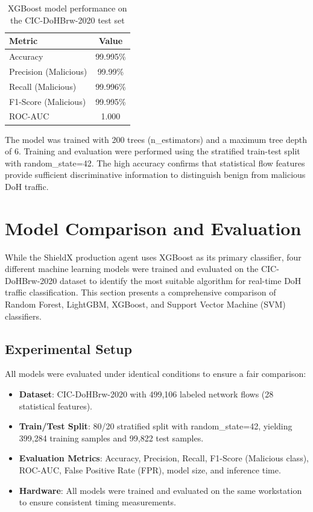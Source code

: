 \documentclass[../Main.tex]{subfiles}
\begin{document}
\begin{table}[H]
\centering
\small
\begin{tabular}{|l|c|}
\hline
\textbf{Metric} & \textbf{Value} \\
\hline
Accuracy & 99.995\% \\
Precision (Malicious) & 99.99\% \\
Recall (Malicious) & 99.996\% \\
F1-Score (Malicious) & 99.995\% \\
ROC-AUC & 1.000 \\
\hline
\end{tabular}
\caption{XGBoost model performance on the CIC-DoHBrw-2020 test set}
\label{tab:model_performance}
\end{table}

The model was trained with 200 trees (n\_estimators) and a maximum tree depth of 6. Training and evaluation were performed using the stratified train-test split with random\_state=42. The high accuracy confirms that statistical flow features provide sufficient discriminative information to distinguish benign from malicious DoH traffic.

\section{Model Comparison and Evaluation}
\label{section:4.6}

While the ShieldX production agent uses XGBoost as its primary classifier, four different machine learning models were trained and evaluated on the CIC-DoHBrw-2020 dataset to identify the most suitable algorithm for real-time DoH traffic classification. This section presents a comprehensive comparison of Random Forest, LightGBM, XGBoost, and Support Vector Machine (SVM) classifiers.

\subsection{Experimental Setup}
\label{section:4.6.1}

All models were evaluated under identical conditions to ensure a fair comparison:

\begin{itemize}
    \item \textbf{Dataset}: CIC-DoHBrw-2020 with 499,106 labeled network flows (28 statistical features).
    \item \textbf{Train/Test Split}: 80/20 stratified split with random\_state=42, yielding 399,284 training samples and 99,822 test samples.
    \item \textbf{Evaluation Metrics}: Accuracy, Precision, Recall, F1-Score (Malicious class), ROC-AUC, False Positive Rate (FPR), model size, and inference time.
    \item \textbf{Hardware}: All models were trained and evaluated on the same workstation to ensure consistent timing measurements.
\end{itemize}
\end{document}
